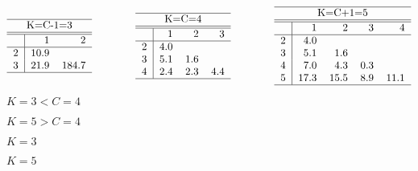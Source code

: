 \documentclass{article}
\def\lthtmlcheckvsize{\ifdim\ht\sizebox<\vsize 
  \ifdim\wd\sizebox<\hsize\expandafter\hfill\fi \expandafter\vfill
  \else\expandafter\vss\fi}%
\begin{document}
{\newpage\clearpage
{}%
$\displaystyle \begin{tabular}{r|rr}\hline
\multicolumn{3}{c}{K=C-1=3}    \\\hline\hline
& 1    & 2     \\\hline
2 & 10.9 &       \\
3 & 21.9 & 184.7 \\\hline
\end{tabular}
\;\;\;\;\;\;\;\;\;\;\;\;\;\;\;
\begin{tabular}{r|rrr}\hline
\multicolumn{4}{c}{K=C=4}\\\hline\hline
& 1   & 2   & 3   \\\hline
2 & 4.0 &     &     \\
3 & 5.1 & 1.6 &     \\
4 & 2.4 & 2.3 & 4.4 \\\hline
\end{tabular}
\;\;\;\;\;\;\;\;\;\;\;\;\;\;\;
\begin{tabular}{r|rrrr}\hline
\multicolumn{5}{c}{K=C+1=5}          \\\hline\hline
& 1   & 2    & 3   & 4    \\\hline
2 & 4.0 &      &     &      \\
3 & 5.1 &  1.6 &     &      \\
4 & 7.0 &  4.3 & 0.3 &      \\
5 &17.3 & 15.5 & 8.9 & 11.1 \\\hline
\end{tabular}$%
\lthtmlindisplaymathZ
\lthtmlcheckvsize\clearpage}

{\newpage\clearpage
{}%
$ K=3<C=4$%
\lthtmlindisplaymathZ
\lthtmlcheckvsize\clearpage}

{\newpage\clearpage
{}%
$ K=5>C=4$%
\lthtmlindisplaymathZ
\lthtmlcheckvsize\clearpage}

{\newpage\clearpage
{}%
$ K=3$%
\lthtmlindisplaymathZ
\lthtmlcheckvsize\clearpage}

{\newpage\clearpage
{}%
$ K=5$%
\lthtmlindisplaymathZ
\lthtmlcheckvsize\clearpage}
\end{document}
